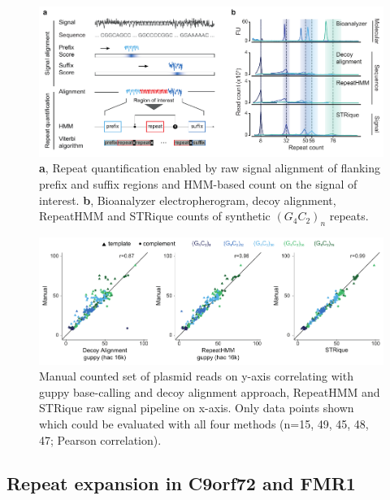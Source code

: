 \begin{figure}[h]
	\centering
	\includegraphics[width=1.0\textwidth]{figures/strique/count_structure_plasmid.pdf}
	\captionsetup{format=plain}
	\caption[STRique: generic repeat detection pipeline on raw nanopore signals.]{\textbf{a}, Repeat quantification enabled by raw signal alignment of flanking prefix and suffix regions and HMM-based count on the signal of interest. \textbf{b}, Bioanalyzer electropherogram, decoy alignment, RepeatHMM and STRique counts of synthetic $ (G_{4}C_{2})_{n} $ repeats.}
	\label{fig:strique:count_structure_plasmid}
\end{figure}

\begin{figure}[h]
	\centering
	\includegraphics[width=1.0\textwidth]{figures/strique/count_signal_corr.pdf}
	\captionsetup{format=plain}
	\caption[Correlation and strand bias in STR analysis methods]{Manual counted set of plasmid reads on y-axis correlating with guppy base-calling and decoy alignment approach, RepeatHMM and STRique raw signal pipeline on x-axis. Only data points shown which could be evaluated with all four methods (n=15, 49, 45, 48, 47; Pearson correlation).}
	\label{fig:strique:count_signal_corr}
\end{figure}




\subsection{Repeat expansion in C9orf72 and FMR1}
\label{subsec:strique:c9orf72}

